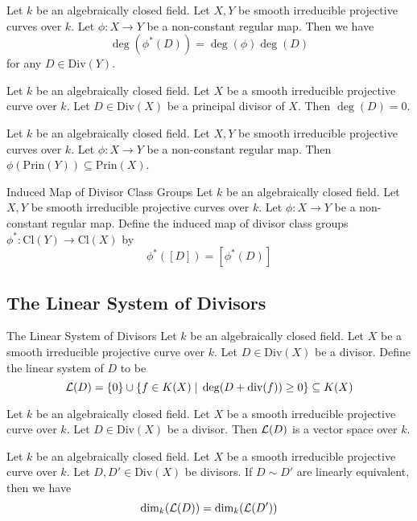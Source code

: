 \documentclass[a4paper]{article}
\begin{document}
\begin{prp}{}{} Let $k$ be an algebraically closed field. Let $X,Y$ be smooth irreducible projective curves over $k$. Let $\phi:X\to Y$ be a non-constant regular map. Then we have $$\deg(\phi^\ast(D))=\deg(\phi)\deg(D)$$ for any $D\in\text{Div}(Y)$. 
\end{prp}

\begin{prp}{}{} Let $k$ be an algebraically closed field. Let $X$ be a smooth irreducible projective curve over $k$. Let $D\in\text{Div}(X)$ be a principal divisor of $X$. Then $\deg(D)=0$. 
\end{prp}

\begin{prp}{}{} Let $k$ be an algebraically closed field. Let $X,Y$ be smooth irreducible projective curves over $k$. Let $\phi:X\to Y$ be a non-constant regular map. Then $\phi(\text{Prin}(Y))\subseteq\text{Prin}(X)$. 
\end{prp}

\begin{defn}{Induced Map of Divisor Class Groups}{} Let $k$ be an algebraically closed field. Let $X,Y$ be smooth irreducible projective curves over $k$. Let $\phi:X\to Y$ be a non-constant regular map. Define the induced map of divisor class groups $\phi^\ast:\text{Cl}(Y)\to\text{Cl}(X)$ by $$\phi^\ast([D])=[\phi^\ast(D)]$$
\end{defn}

\subsection{The Linear System of Divisors}
\begin{defn}{The Linear System of Divisors}{} Let $k$ be an algebraically closed field. Let $X$ be a smooth irreducible projective curve over $k$. Let $D\in\text{Div}(X)$ be a divisor. Define the linear system of $D$ to be $$\mathcal{L}(D)=\{0\}\cup\{f\in K(X)\;|\;\deg(D+\text{div}(f))\geq 0\}\subseteq K(X)$$
\end{defn}

\begin{lmm}{}{} Let $k$ be an algebraically closed field. Let $X$ be a smooth irreducible projective curve over $k$. Let $D\in\text{Div}(X)$ be a divisor. Then $\mathcal{L}(D)$ is a vector space over $k$. 
\end{lmm}

\begin{prp}{}{} Let $k$ be an algebraically closed field. Let $X$ be a smooth irreducible projective curve over $k$. Let $D,D'\in\text{Div}(X)$ be divisors. If $D\sim D'$ are linearly equivalent, then we have $$\dim_k(\mathcal{L}(D))=\dim_k(\mathcal{L}(D'))$$
\end{prp}
\end{document}
